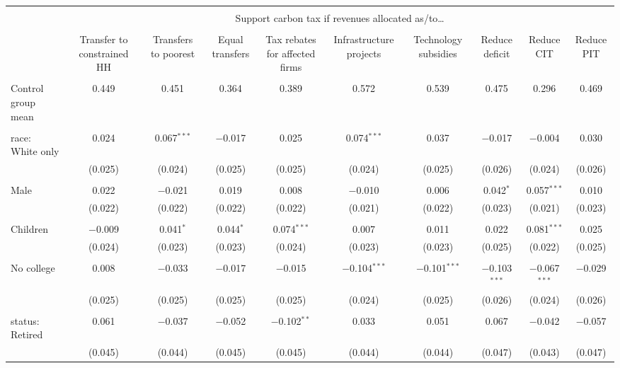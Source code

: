 
\begin{tabular}{@{\extracolsep{5pt}}lccccccccc} 
\\[-1.8ex]\hline 
\hline \\[-1.8ex] 
 & \multicolumn{9}{c}{Support carbon tax if revenues allocated as/to…} \\ 
\cline{2-10} 
\\[-1.8ex] & Transfer to constrained HH & Transfers to poorest & Equal transfers & Tax rebates for affected firms & Infrastructure projects & Technology subsidies & Reduce deficit & Reduce CIT & Reduce PIT \\ 
\hline \\[-1.8ex] 
 Control group mean & 0.449 & 0.451 & 0.364 & 0.389 & 0.572 & 0.539 & 0.475 & 0.296 & 0.469  \\ \hline \\[-1.8ex] race: White only & 0.024 & 0.067$^{***}$ & $-$0.017 & 0.025 & 0.074$^{***}$ & 0.037 & $-$0.017 & $-$0.004 & 0.030 \\ 
  & (0.025) & (0.024) & (0.025) & (0.025) & (0.024) & (0.025) & (0.026) & (0.024) & (0.026) \\ 
  & & & & & & & & & \\ 
 Male & 0.022 & $-$0.021 & 0.019 & 0.008 & $-$0.010 & 0.006 & 0.042$^{*}$ & 0.057$^{***}$ & 0.010 \\ 
  & (0.022) & (0.022) & (0.022) & (0.022) & (0.021) & (0.022) & (0.023) & (0.021) & (0.023) \\ 
  & & & & & & & & & \\ 
 Children & $-$0.009 & 0.041$^{*}$ & 0.044$^{*}$ & 0.074$^{***}$ & 0.007 & 0.011 & 0.022 & 0.081$^{***}$ & 0.025 \\ 
  & (0.024) & (0.023) & (0.023) & (0.024) & (0.023) & (0.023) & (0.025) & (0.022) & (0.025) \\ 
  & & & & & & & & & \\ 
 No college & 0.008 & $-$0.033 & $-$0.017 & $-$0.015 & $-$0.104$^{***}$ & $-$0.101$^{***}$ & $-$0.103$^{***}$ & $-$0.067$^{***}$ & $-$0.029 \\ 
  & (0.025) & (0.025) & (0.025) & (0.025) & (0.024) & (0.025) & (0.026) & (0.024) & (0.026) \\ 
  & & & & & & & & & \\ 
 status: Retired & 0.061 & $-$0.037 & $-$0.052 & $-$0.102$^{**}$ & 0.033 & 0.051 & 0.067 & $-$0.042 & $-$0.057 \\ 
  & (0.045) & (0.044) & (0.045) & (0.045) & (0.044) & (0.044) & (0.047) & (0.043) & (0.047) \\ 

\end{tabular}
